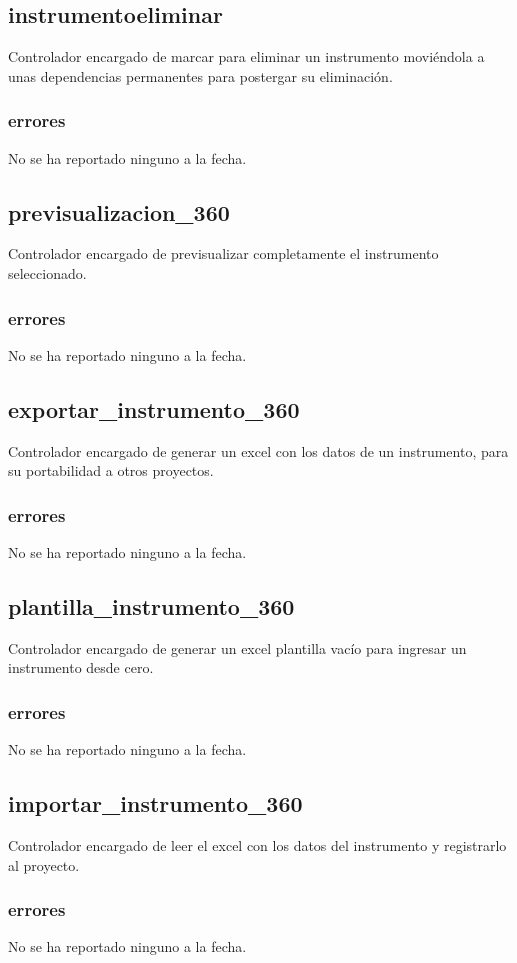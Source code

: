 \documentclass[10pt,a4paper]{book}
\begin{document}
	\subsection{instrumentoeliminar}
	Controlador encargado de marcar para eliminar un instrumento moviéndola a unas dependencias permanentes para postergar su eliminación.
	\subsubsection{errores}
	No se ha reportado ninguno a la fecha.
	
	\subsection{previsualizacion\_360}
	Controlador encargado de previsualizar completamente el instrumento seleccionado.
	\subsubsection{errores}
	No se ha reportado ninguno a la fecha.
	
	\subsection{exportar\_instrumento\_360}
	Controlador encargado de generar un excel con los datos de un instrumento, para su portabilidad a otros proyectos.
	\subsubsection{errores}
	No se ha reportado ninguno a la fecha.
	
	\subsection{plantilla\_instrumento\_360}
	Controlador encargado de generar un excel plantilla vacío para ingresar un instrumento desde cero.
	\subsubsection{errores}
	No se ha reportado ninguno a la fecha.
	
	\subsection{importar\_instrumento\_360}
	Controlador encargado de leer el excel con los datos del instrumento y registrarlo al proyecto.
	\subsubsection{errores}
	No se ha reportado ninguno a la fecha.
\end{document}
